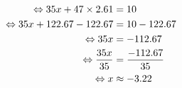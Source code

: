 \documentclass{article}%
\begin{document}
\ \\%
\vspace{5mm}%
\newline%
\begin{align*}%
\ \Leftrightarrow  35x + 47 \times 2.61 &= 10 \\%
\vspace{5mm}%
\newline%
\ \Leftrightarrow  35x + 122.67 -122.67 &= 10 - 122.67 \\%
\vspace{5mm}%
\newline%
\ \Leftrightarrow  35x  &= -112.67 \\%
\vspace{5mm}%
\newline%
\ \Leftrightarrow  \frac{35x}{35} &= \frac{-112.67}{35}\\%
\vspace{5mm}%
\newline%
\ \Leftrightarrow  x &\approx -3.22 \\%
\vspace{5mm}%
\newline%
\end{align*}

%
\end{document}
